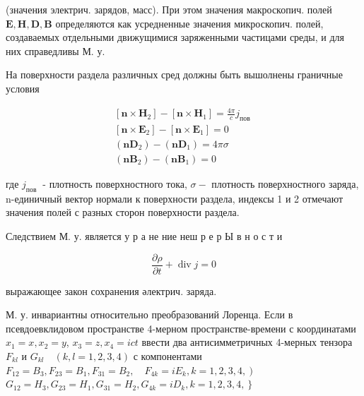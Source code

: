 \documentclass[10pt]{article}
\begin{document}
(значения электрич. зарядов, масс). При этом значения макроскопич. полей $\boldsymbol{E}, \boldsymbol{H}, \boldsymbol{D}, \boldsymbol{B}$ определяются как усредненные значения микроскопич. полей, создаваемых отдельными движущимися заряженными частицами среды, и для них справедливы М. у.



На поверхности раздела различных сред должны быть вышолнены граничные условия



\[

\begin{gathered}

{\left[\boldsymbol{n} \times \boldsymbol{H}_{2}\right]-\left[\boldsymbol{n} \times \boldsymbol{H}_{1}\right]=\frac{4 \pi}{c} j_{\text {пов }}} \\

{\left[\boldsymbol{n} \times \boldsymbol{E}_{2}\right]-\left[\boldsymbol{n} \times \boldsymbol{E}_{1}\right]=0} \\

\left(\boldsymbol{n} \boldsymbol{D}_{2}\right)-\left(\boldsymbol{n} \boldsymbol{D}_{1}\right)=4 \pi \sigma \\

\left(\boldsymbol{n} \boldsymbol{B}_{2}\right)-\left(\boldsymbol{n} \boldsymbol{B}_{1}\right)=0

\end{gathered}

\]



где $j_{\text {пов }}$ - плотность поверхностного тока, $\sigma-$ плотность поверхностного заряда, n-единичный вектор нормали к поверхности раздела, индексы 1 и 2 отмечают значения полей с разных сторон поверхности раздела.



Следствием М. у. является у р а не ние неш р е р Ы в н о с т и



\[

\frac{\partial \rho}{\partial t}+\operatorname{div} j=0

\]



выражающее закон сохранения әлектрич. заряда.



М. у. инвариантны относительно преобразований Лоренца. Если в псевдоевклидовом пространстве 4-мерном пространстве-времени с координатами $x_{1}=x, x_{2}=y$, $x_{3}=z, x_{4}=i c t$ ввести два антисимметричных 4-мерных тензора $F_{k l}$ и $G_{k l} \quad(k, l=1,2,3,4)$ с компонентами $\left.F_{12}=B_{3}, F_{23}=B_{1}, F_{31}=B_{2}, \quad F_{4 k}=i E_{k}, k=1,2,3,4,\right)$ $\left.G_{12}=H_{3}, G_{23}=H_{1}, G_{31}=H_{2}, G_{4 k}=i D_{k}, k=1,2,3,4,\right\}$
\end{document}
